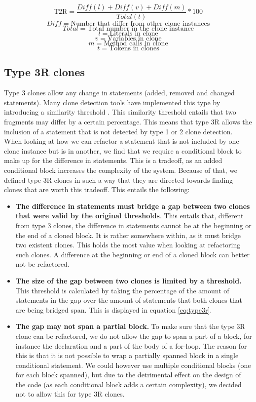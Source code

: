 \documentclass[a4paper]{article}
\begin{document}
\begin{equation}\label{eq:type2r}
\text{T2R}=\frac{Diff(l) + Diff(v) + Diff(m)}{Total(t)}*100
\end{equation}
$$Diff = \text{Number that differ from other clone instances}$$
$$Total = \text{Total number in the clone instance}$$
$$l = \text{Literals in clone}$$
$$v = \text{Variables in clone}$$
$$m = \text{Method calls in clone}$$
$$t = \text{Tokens in clones}$$

\subsection{Type 3R clones}
Type 3 clones allow any change in statements (added, removed and changed statements). Many clone detection tools have implemented this type by introducing a similarity threshold \cite{roy2008nicad,ragkhitwetsagul2019siamese,jiang2007deckard,semura2017ccfindersw}. This similarity threshold entails that two fragments may differ by a certain percentage. This means that type 3R allows the inclusion of a statement that is not detected by type 1 or 2 clone detection. When looking at how we can refactor a statement that is not included by one clone instance but is in another, we find that we require a conditional block to make up for the difference in statements. This is a tradeoff, as an added conditional block increases the complexity of the system. Because of that, we defined type 3R clones in such a way that they are directed towards finding clones that are worth this tradeoff. This entails the following:

\begin{itemize}
  \item \textbf{The difference in statements must bridge a gap between two clones that were valid by the original thresholds}. This entails that, different from type 3 clones, the difference in statements cannot be at the beginning or the end of a cloned block. It is rather somewhere within, as it must bridge two existent clones. This holds the most value when looking at refactoring such clones. A difference at the beginning or end of a cloned block can better not be refactored.
  \item \textbf{The size of the gap between two clones is limited by a threshold.} This threshold is calculated by taking the percentage of the amount of statements in the gap over the amount of statements that both clones that are being bridged span. This is displayed in equation \ref{eq:type3r}.
  \item \textbf{The gap may not span a partial block.} To make sure that the type 3R clone can be refactored, we do not allow the gap to span a part of a block, for instance the declaration and a part of the body of a for-loop. The reason for this is that it is not possible to wrap a partially spanned block in a single conditional statement. We could however use multiple conditional blocks (one for each block spanned), but due to the detrimental effect on the design of the code (as each conditional block adds a certain complexity), we decided not to allow this for type 3R clones.
\end{itemize}
\end{document}
